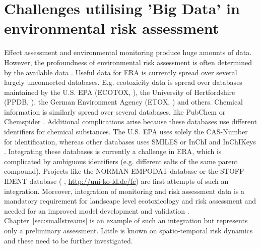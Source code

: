 \section{Challenges utilising 'Big Data' in environmental risk assessment}

Effect assessment and environmental monitoring produce huge amounts of data. 
However, the profoundness of environmental risk assessment is often determined by the available data \citep{van_den_brink_new_2016}.
Useful data for ERA is currently spread over several largely unconnected databases. 
E.g. ecotoxicity data is spread over databases maintained by the U.S. EPA (ECOTOX, \citet{u.s._epa_ecotox_2016}), the University of Hertfordshire (PPDB, \citet{lewis_international_2016}), the German Environment Agency (ETOX, \citet{umweltbundesamt_etox:_2016}) and others. 
Chemical information is similarly spread over several databases, like PubChem \citep{kim_pubchem_2016} or Chemspider \citep{pence_chemspider:_2010}.
Additional complications arise because these databases use different identifiers for chemical substances. 
The U.S. EPA \citep{u.s._epa_ecotox_2016} uses solely the CAS-Number for identification, whereas other databases uses SMILES \citep{weininger_smiles._1990} or InChI and InChIKeys \citep{heller_inchi_2015}. 
Integrating these databases is currently a challenge in ERA, which is complicated by ambiguous identifiers (e.g.  different salts of the same parent compound).
Projects like the NORMAN EMPODAT database \citep{brack_norman_2012} or the STOFF-IDENT database (\citeauthor{huckele_risk_2013} \cite*{huckele_risk_2013}, \url{http://uni-ko-ld.de/fc}) are first attempts of such an integration.
Moreover, integration of monitoring and risk assessment data is a mandatory requirement for landscape level ecotoxicology and risk assessment \citep{focks_challenge:_2014} and needed for an improved model development and validation \citep{knabel_regulatory_2012, brock_aquatic_2006}. 
Chapter~\ref{sec:smallstreams} is an example of such an integration but represents only a preliminary assessment.
Little is known on spatio-temporal risk dynamics and these need to be further investigated. 

